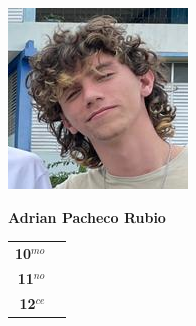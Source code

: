 \begin{minipage}{0.2\textwidth}
	\includegraphics[width=\linewidth]{img/concursantes/adrian.png} %
\end{minipage}
\hfill
\begin{minipage}{0.7\textwidth}
	\textbf{Adrian Pacheco Rubio}
	
	\vspace*{0.1in}
	\begin{tabular}{rl}
		
		\textbf{10$^{mo}$} &   \\
		
		\textbf{11$^{no}$} &  \\
		
		\textbf{12$^{ce}$} &   \\
		
		
	\end{tabular}
\end{minipage}

